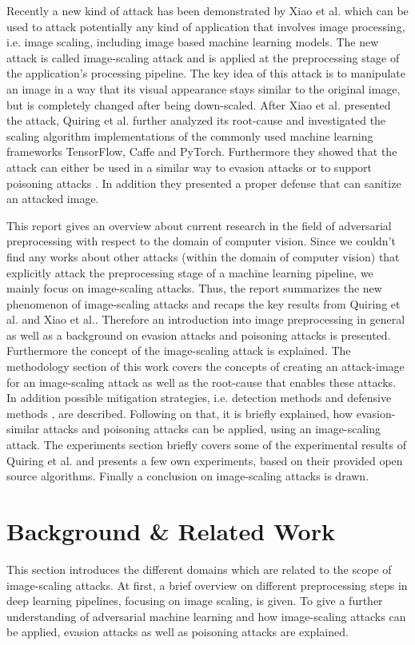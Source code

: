 \documentclass[sigconf]{acmart}
\begin{document}
Recently a new kind of attack has been demonstrated by Xiao et al.\cite{camouflage} which can be used to attack potentially any kind of application that involves image processing, i.e. image scaling, including image based machine learning models.
The new attack is called image-scaling attack and is applied at the preprocessing stage of the application's processing pipeline.
The key idea of this attack is to manipulate an image in a way that its visual appearance stays similar to the original image, but is completely changed after being down-scaled.
After Xiao et al.\cite{camouflage} presented the attack, Quiring et al.\cite{imgscale} further analyzed its root-cause and investigated the scaling algorithm implementations of the commonly used machine learning frameworks TensorFlow, Caffe and PyTorch.
Furthermore they showed that the attack can either be used in a similar way to evasion attacks or to support poisoning attacks \cite{imgscalepoison}.
In addition they presented a proper defense that can sanitize an attacked image.

This report gives an overview about current research in the field of adversarial preprocessing with respect to the domain of computer vision.
Since we couldn't find any works about other attacks (within the domain of computer vision) that explicitly attack the preprocessing stage of a machine learning pipeline, we mainly focus on image-scaling attacks.
Thus, the report summarizes the new phenomenon of image-scaling attacks and recaps the key results from Quiring et al. and Xiao et al.\cite{imgscale, imgscalepoison, camouflage}.
Therefore an introduction into image preprocessing in general as well as a background on evasion attacks and poisoning attacks is presented.
Furthermore the concept of the image-scaling attack is explained.
The methodology section of this work covers the concepts of creating an attack-image for an image-scaling attack as well as the root-cause that enables these attacks.
In addition possible mitigation strategies, i.e. detection methods \cite{camouflage} and defensive methods \cite{imgscale}, are described.
Following on that, it is briefly explained, how evasion-similar attacks and poisoning attacks can be applied, using an image-scaling attack.
The experiments section briefly covers some of the experimental results of Quiring et al. and presents a few own experiments, based on their provided open source algorithms.
Finally a conclusion on image-scaling attacks is drawn.

\section{Background \& Related Work}
This section introduces the different domains which are related to the scope of image-scaling attacks.
At first, a brief overview on different preprocessing steps in deep learning pipelines, focusing on image scaling, is given.
To give a further understanding of adversarial machine learning and how image-scaling attacks can be applied, evasion attacks as well as poisoning attacks are explained.
\end{document}
